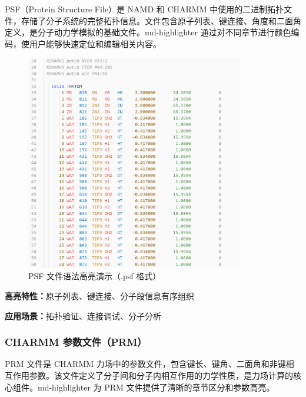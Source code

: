PSF（Protein Structure File）是 NAMD 和 CHARMM 中使用的二进制拓扑文件，存储了分子系统的完整拓扑信息。文件包含原子列表、键连接、角度和二面角定义，是分子动力学模拟的基础文件。md-highlighter 通过对不同章节进行颜色编码，使用户能够快速定位和编辑相关内容。

\begin{figure}[!h]
    \centering
    \includegraphics[width=0.85\textwidth]{../images/psf.png}
    \caption{PSF 文件语法高亮演示（.psf 格式）}
    \label{fig:psf-highlighting}
\end{figure}

\textbf{高亮特性：}原子列表、键连接、分子段信息有序组织

\textbf{应用场景：}拓扑验证、连接调试、分子分析

\subsubsection{CHARMM 参数文件（PRM）}

PRM 文件是 CHARMM 力场中的参数文件，包含键长、键角、二面角和非键相互作用参数。该文件定义了分子间和分子内相互作用的力学性质，是力场计算的核心组件。md-highlighter 为 PRM 文件提供了清晰的章节区分和参数高亮。

